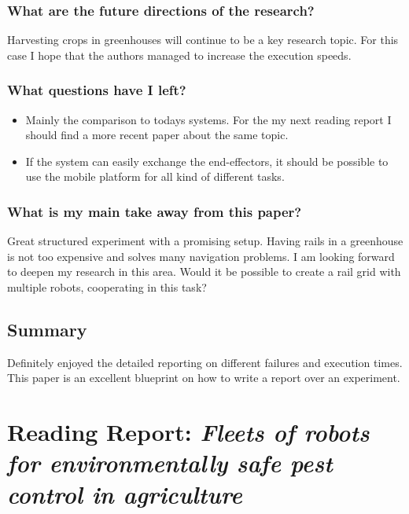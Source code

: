     \subsubsection*{What are the future directions of the research?}
    Harvesting crops in greenhouses will continue to be a key research topic. For this case I hope that the authors managed to increase the execution speeds.
    \subsubsection*{What questions have I left?} 
    \begin{itemize}
        \item Mainly the comparison to todays systems. For the my next reading report I should find a more recent paper about the same topic.
        \item If the system can easily exchange the end-effectors, it should be possible to use the mobile platform for all kind of different tasks.
    \end{itemize}
    \subsubsection*{What is my main take away from this paper?}
    Great structured experiment with a promising setup. Having rails in a greenhouse is not too expensive and solves many navigation problems. I am looking forward to deepen my research in this area.
    Would it be possible to create a rail grid with multiple robots, cooperating in this task?
    
    \subsection*{Summary}
    Definitely enjoyed the detailed reporting on different failures and execution times. This paper is an excellent blueprint on how to write a report over an experiment.
    
    

    
    \newpage
    \section{Reading Report: \emph{Fleets of robots for environmentally safe pest control in agriculture}}
    \label{sec:deSantos2016}
    \cite{deSantos2016}
    
